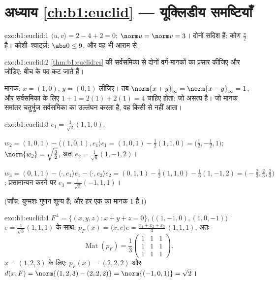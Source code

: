 \section*{अध्याय \ref{ch:b1:euclid} --- यूक्लिडीय समष्टियाँ}

\begin{solution}{exo:b1:euclid:1}
$\langle u, v\rangle = 2 - 4 + 2 = 0$; $\norm u = \norm v = 3$। दोनों सदिश
 हैं: कोण $\frac\pi2$ है। कोशी--श्वार्ट्ज़: $\abs 0 \leq 9$, और वह भी
आराम से।
\end{solution}

\begin{solution}{exo:b1:euclid:2}
\cref{thm:b1:euclid:cs} की सर्वसमिका से दोनों वर्ग-मानकों का प्रसार कीजिए और
जोड़िए: बीच के पद कट जाते हैं।

 मानक: $x = (1, 0)$, $y = (0, 1)$ लीजिए। तब $\norm{x + y}_\infty =
\norm{x - y}_\infty = 1$, और सर्वसमिका के लिए $1 + 1 = 2(1) + 2(1) = 4$
चाहिए होता: जो असत्य है। जो मानक समांतर चतुर्भुज सर्वसमिका का उल्लंघन करता
है, वह किसी  से नहीं आता।
\end{solution}

\begin{solution}{exo:b1:euclid:3}
$e_1 = \frac{1}{\sqrt 2}(1,1,0)$.

$w_2 = (1,0,1) - \langle (1,0,1), e_1\rangle e_1 = (1,0,1) -
\frac{1}{2}(1,1,0) = \bigl(\tfrac12, -\tfrac12, 1\bigr)$; $\norm{w_2} =
\sqrt{\tfrac32}$, अतः $e_2 = \frac{1}{\sqrt 6}(1, -1, 2)$।

$w_3 = (0,1,1) - \langle\cdot, e_1\rangle e_1 - \langle\cdot, e_2\rangle e_2
= (0,1,1) - \frac12 (1,1,0) - \frac16(1,-1,2) = \bigl(-\tfrac23, \tfrac23,
\tfrac23\bigr)$; प्रसामान्यन करने पर $e_3 = \frac{1}{\sqrt 3}(-1, 1, 1)$।

(जाँच: युग्मशः गुणन शून्य हैं; और हर एक का मानक $1$ है।)
\end{solution}

\begin{solution}{exo:b1:euclid:4}
$F^\perp = \{(x,y,z) : x + y + z = 0\}$,  $\bigl((1,-1,0),
(1,0,-1)\bigr)$। $e = \frac{1}{\sqrt3}(1,1,1)$ के साथ: $p_F(x) = \langle x,
e\rangle e = \frac{x_1 + x_2 + x_3}{3}\,(1,1,1)$, अतः
\[
\operatorname{Mat}(p_F) = \frac13
\begin{pmatrix} 1&1&1\\ 1&1&1\\ 1&1&1\end{pmatrix}.
\]
$x = (1,2,3)$ के लिए: $p_F(x) = (2,2,2)$ और $d(x, F) = \norm{(1,2,3) -
(2,2,2)} = \norm{(-1,0,1)} = \sqrt 2$।
\end{solution}

